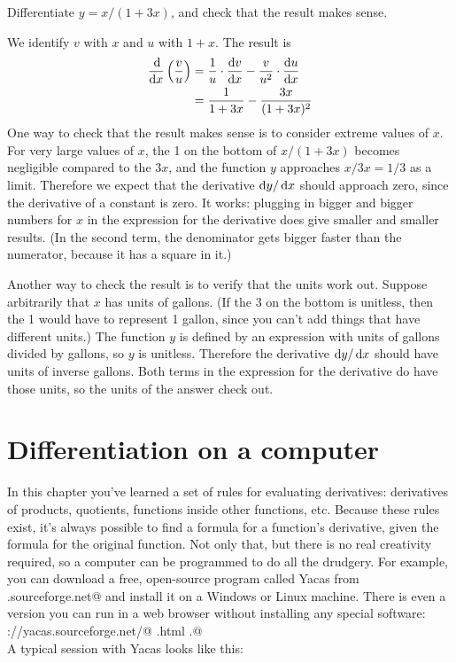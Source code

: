 \begin{eg}
\egquestion Differentiate $y=x/(1+3x)$, and check that the result makes sense.

\eganswer We identify $v$ with $x$ and $u$ with $1+x$. The result is
\begin{align*}
  \frac{\operatorname{d\!}}{\operatorname{d\!} x} \left(\frac{v}{u}\right) &= \frac{1}{u}\cdot\frac{\operatorname{d\!} v}{\operatorname{d\!} x} - \frac{v}{u^2} \cdot \frac{\operatorname{d\!} u}{\operatorname{d\!} x} \\
            &= \frac{1}{1+3x} - \frac{3x}{(1+3x)^2}
\end{align*}
One way to check that the result makes sense is to consider extreme values of $x$. For very large values of $x$, the
1 on the bottom of $x/(1+3x)$ becomes negligible compared to the $3x$, and the function $y$ approaches $x/3x=1/3$ as a limit.
Therefore we expect that the derivative $\operatorname{d\!} y/\operatorname{d\!} x$ should approach zero, since the derivative of a constant is
zero. It works: plugging in bigger and bigger numbers for $x$ in the expression for the derivative does give
smaller and smaller results. (In the second term, the denominator gets bigger faster than the numerator, because
it has a square in it.)

Another way to check the result is to verify that the units work out. Suppose arbitrarily that $x$ has units of gallons.
(If the 3 on the bottom is unitless, then the 1 would have to represent 1 gallon, since you can't add things that have
different units.) The function $y$ is defined by an expression with units of gallons divided by gallons, so $y$ is
unitless. Therefore the derivative $\operatorname{d\!} y/\operatorname{d\!} x$ should have units of inverse gallons. Both terms in the
expression for the derivative do have those units, so the units of the answer check out.
\end{eg}

\section{Differentiation on a computer}
In this chapter you've learned a set of rules for evaluating derivatives: derivatives of products,
quotients, functions inside other functions, etc. Because these rules exist, it's always
possible to find a formula for a function's derivative, given the formula for the original
function. Not only that, but there is no real creativity required, so a computer can be
programmed to do all the drudgery. For example, you can download a free, open-source program
called Yacas from \verb@yacas.sourceforge.net@
%
%
and install it on a Windows or Linux machine. There is even a version you can run in a web
browser without installing any special software:
\verb@http://yacas.sourceforge.net/@
\verb@yacasconsole.html  .@\\
 A typical session with Yacas looks like this:

